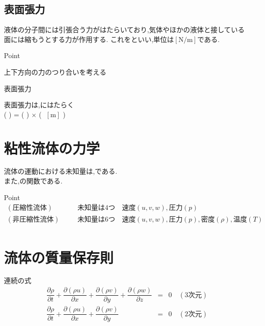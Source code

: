 \documentclass[a4paper]{jsarticle}
\begin{document}
\subsection{表面張力}
液体の分子間には引張合う力がはたらいており,気体やほかの液体と接している面には縮もうとする力が作用する.
これをといい,単位は$\left[\mathrm{N/m}\right]$である.
\begin{itembox}[l]{Point}
    \begin{center}
        上下方向の力のつり合いを考える\\
    \end{center}
\end{itembox}
\begin{itembox}[l]{表面張力}
    \begin{center}
        表面張力は,にはたらく\\
        (  ) = ( ) $\times$ ( $\;\left[\mathrm{m}\right]$ )
    \end{center}
\end{itembox}
\section{粘性流体の力学}
流体の運動における未知量は,である.\\
また,の関数である.\\
\begin{itembox}[l]{Point}
    \begin{eqnarray*}
        (圧縮性流体)&&\quad 未知量は4つ\quad 速度\left(u,v,w\right),圧力\left(p\right)\\
        (非圧縮性流体)&&\quad 未知量は6つ\quad 速度\left(u,v,w\right),圧力\left(p\right),密度\left(\rho\right),温度\left(T\right)\\
    \end{eqnarray*}
\end{itembox}
\section{流体の質量保存則}
\begin{itembox}[l]{連続の式}
    \begin{eqnarray*}
        \dfrac{\partial\rho}{\partial t}+\dfrac{\partial \left(\rho u\right)}{\partial x}+\dfrac{\partial \left(\rho v\right)}{\partial y}+\dfrac{\partial \left(\rho w\right)}{\partial z}&=&0\quad(3次元)\\
        \dfrac{\partial\rho}{\partial t}+\dfrac{\partial \left(\rho u\right)}{\partial x}+\dfrac{\partial \left(\rho v\right)}{\partial y}&=&0\quad(2次元)\\
    \end{eqnarray*}
\end{itembox}
\end{document}
